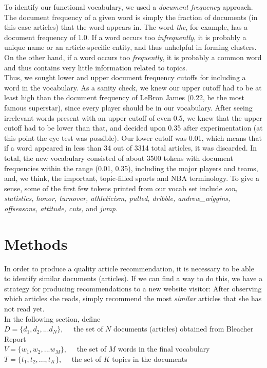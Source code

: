\documentclass[11pt]{article}
\begin{document}
To identify our functional vocabulary, we used a \textit{document frequency} approach. The document frequency of a given word is simply the fraction of documents (in this case articles) that the word appears in. The word \textit{the}, for example, has a document frequency of 1.0. If a word occurs too \textit{infrequently}, it is probably a unique name or an article-specific entity, and thus unhelpful in forming clusters. On the other hand, if a word occurs too \textit{frequently}, it is probably a common word and thus contains very little information related to topics.  \\

Thus, we sought lower and upper document frequency cutoffs for including a word in the vocabulary.  As a sanity check, we knew our upper cutoff had to be at least high than the document frequency of LeBron James (0.22, he the most famous superstar), since every player should be in our vocabulary. After seeing irrelevant words present with an upper cutoff of even 0.5, we knew that the upper cutoff had to be lower than that, and decided upon 0.35 after experimentation (at this point the eye test was possible). Our lower cutoff was 0.01, which means that if a word appeared in less than 34 out of 3314 total articles, it was discarded.  In total, the new vocabulary consisted of about 3500 tokens with document frequencies within the range (0.01, 0.35), including the major players and teams, and, we think, the important, topic-filled sports and NBA terminology. To give a sense, some of the first few tokens printed from our vocab set include \textit{son, statistics, honor, turnover, athleticism, pulled, dribble, andrew\_wiggins, offseasons, attitude, cuts,} and \textit{jump}.  


\section{Methods}
In order to produce a quality article recommendation, it is necessary to be able to identify similar documents (articles).  If we can find a way to do this, we have a strategy for producing recommendations to a new website visitor: After observing which articles she reads, simply recommend the most \textit{similar} articles that she has not read yet.\\

In the following section, define \\
$D = \{d_1, d_2, ... d_N \}, \quad$ the set of $N$ documents (articles) obtained from Bleacher Report \\
$V = \{w_1, w_2, ... w_M \}, \quad$ the set of $M$ words in the final vocabulary \\
$T = \{t_1, t_2, ..., t_K\}, \quad$ the set of $K$ topics in the documents \\
\end{document}
